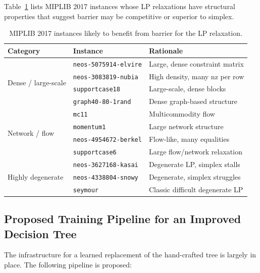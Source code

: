 \documentclass[11pt,a4paper]{article}
\begin{document}
Table~\ref{tab:barrier} lists MIPLIB 2017 instances whose LP relaxations
have structural properties that suggest barrier may be competitive or
superior to simplex.

\begin{table}[htbp]
\centering
\caption{MIPLIB 2017 instances likely to benefit from barrier for the LP relaxation.}
\label{tab:barrier}
\begin{tabular}{@{}llp{6.5cm}@{}}
\toprule
\textbf{Category} & \textbf{Instance} & \textbf{Rationale} \\
\midrule
\multirow{4}{*}{Dense / large-scale}
  & \texttt{neos-5075914-elvire}  & Large, dense constraint matrix \\
  & \texttt{neos-3083819-nubia}   & High density, many nz per row \\
  & \texttt{supportcase18}        & Large-scale, dense blocks \\
  & \texttt{graph40-80-1rand}     & Dense graph-based structure \\
\midrule
\multirow{4}{*}{Network / flow}
  & \texttt{mc11}                 & Multicommodity flow \\
  & \texttt{momentum1}            & Large network structure \\
  & \texttt{neos-4954672-berkel}  & Flow-like, many equalities \\
  & \texttt{supportcase6}         & Large flow/network relaxation \\
\midrule
\multirow{3}{*}{Highly degenerate}
  & \texttt{neos-3627168-kasai}   & Degenerate LP, simplex stalls \\
  & \texttt{neos-4338804-snowy}   & Degenerate, simplex struggles \\
  & \texttt{seymour}              & Classic difficult degenerate LP \\
\bottomrule
\end{tabular}
\end{table}

\subsection{Proposed Training Pipeline for an Improved Decision Tree}
\label{sec:pipeline}

The infrastructure for a learned replacement of the hand-crafted tree is
largely in place.  The following pipeline is proposed:
\end{document}
